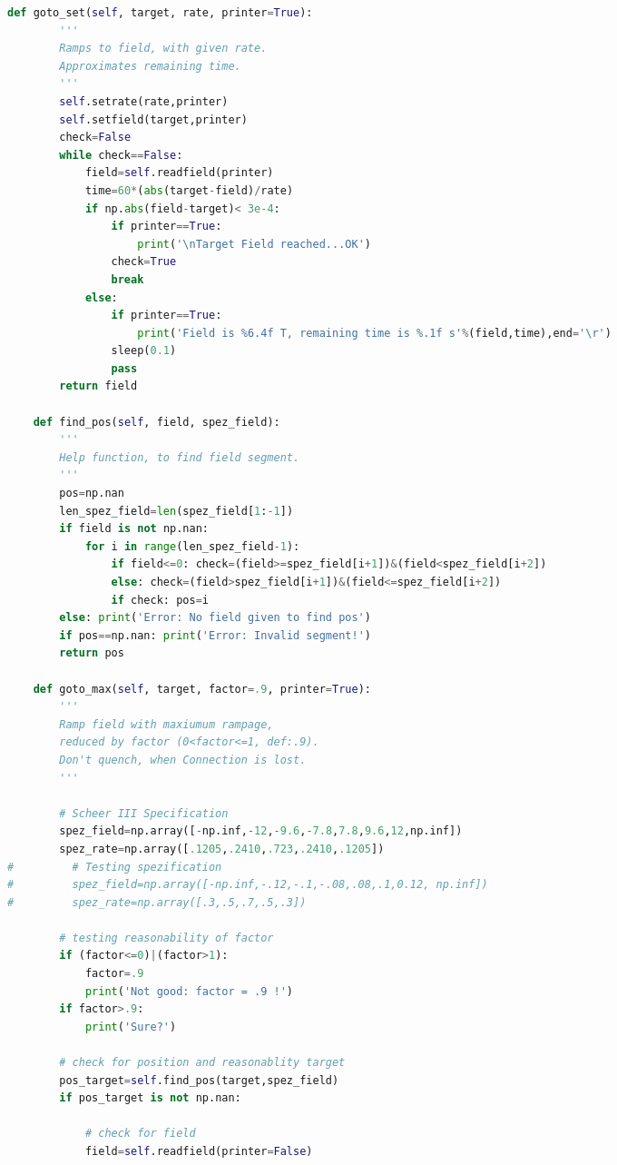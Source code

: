 \begin{landscape}
\begin{multicols}{2}
\begin{lstlisting}[language=Python]
    def goto_set(self, target, rate, printer=True):
        '''
        Ramps to field, with given rate.
        Approximates remaining time.
        '''
        self.setrate(rate,printer)
        self.setfield(target,printer)
        check=False
        while check==False:
            field=self.readfield(printer)
            time=60*(abs(target-field)/rate)
            if np.abs(field-target)< 3e-4:
                if printer==True:
                    print('\nTarget Field reached...OK')
                check=True
                break
            else:
                if printer==True:
                    print('Field is %6.4f T, remaining time is %.1f s'%(field,time),end='\r')
                sleep(0.1)
                pass
        return field

    def find_pos(self, field, spez_field):
        '''
        Help function, to find field segment.
        '''
        pos=np.nan
        len_spez_field=len(spez_field[1:-1])
        if field is not np.nan:
            for i in range(len_spez_field-1):
                if field<=0: check=(field>=spez_field[i+1])&(field<spez_field[i+2])
                else: check=(field>spez_field[i+1])&(field<=spez_field[i+2])
                if check: pos=i
        else: print('Error: No field given to find pos')
        if pos==np.nan: print('Error: Invalid segment!')
        return pos

    def goto_max(self, target, factor=.9, printer=True):
        '''
        Ramp field with maxiumum rampage,
        reduced by factor (0<factor<=1, def:.9).
        Don't quench, when Connection is lost.
        '''
    
        # Scheer III Specification        
        spez_field=np.array([-np.inf,-12,-9.6,-7.8,7.8,9.6,12,np.inf])
        spez_rate=np.array([.1205,.2410,.723,.2410,.1205])
#         # Testing spezification
#         spez_field=np.array([-np.inf,-.12,-.1,-.08,.08,.1,0.12, np.inf])
#         spez_rate=np.array([.3,.5,.7,.5,.3])
    
        # testing reasonability of factor
        if (factor<=0)|(factor>1):
            factor=.9
            print('Not good: factor = .9 !')
        if factor>.9:
            print('Sure?')
            
        # check for position and reasonablity target
        pos_target=self.find_pos(target,spez_field)
        if pos_target is not np.nan:
            
            # check for field
            field=self.readfield(printer=False)
            

\end{lstlisting}
\end{multicols}
\end{landscape}
